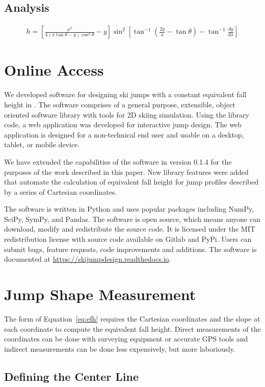 \documentclass{article}
\begin{document}
\subsection{Analysis}

\begin{align}
  h = [\frac{x^2}{4(x\tan\theta - y)\cos^{2}\theta} -
    y]\sin^{2}[\tan^{-1}(\frac{2y}{x}- \tan\theta)- \tan^{-1}\frac{dy}{dx}]
  \label{eq:efh}
\end{align}

\section{Online Access}
%
We developed software for designing ski jumps with a constant equivalent fall
height in \cite{Moore2018}. The software comprises of a general purpose,
extensible, object oriented software library with tools for 2D skiing
simulation. Using the library code, a web application was developed for
interactive jump design. The web application is designed for a non-technical
end user and usable on a desktop, tablet, or mobile device.

We have extended the capabilities of the software in version 0.1.4 for the
purposes of the work described in this paper. New library features were added
that automate the calculation of equivalent fall height for jump profiles
described by a series of Cartesian coordinates.

The software is written in Python and uses popular packages including NumPy,
SciPy, SymPy, and Pandas.  The software is open source, which means anyone can
download, modify and redistribute the source code. It is licensed under the MIT
redistribution license with source code available on Gitlab and PyPi. Users can
submit bugs, feature requests, code improvements and additions.  The software
is documented at
\href{https://skijumpdesign.readthedocs.io}{https://skijumpdesign.readthedocs.io}.

\section{Jump Shape Measurement}
%
The form of Equation~\ref{eq:efh} requires the Cartesian coordinates and the
slope at each coordinate to compute the equivalent fall height. Direct
measurements of the coordinates can be done with surveying equipment or
accurate GPS tools and indirect measurements can be done less expensively, but
more laboriously.

\subsection{Defining the Center Line}
%
\end{document}
